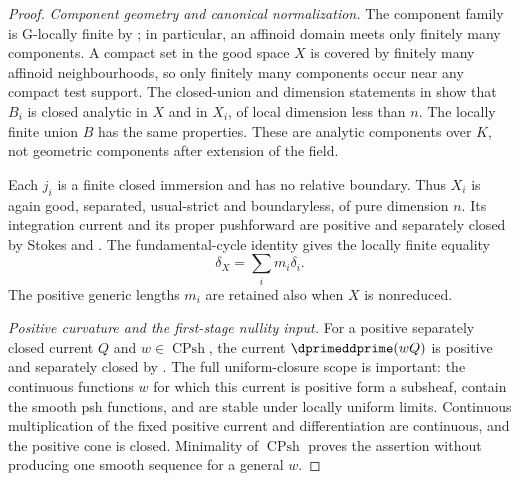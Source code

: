 \begin{proof}
\emph{Component geometry and canonical normalization.}
The component family is G-locally finite by
\cite[Theorem~4.20]{Ducros09Excellence}; in particular, an affinoid domain
meets only finitely many components.  A compact set in the good space $X$
is covered by finitely many affinoid neighbourhoods, so only finitely many
components occur near any compact test support.  The closed-union and
dimension statements in
\cite[\S4, especially Theorem~4.20 and paragraphs~4.21--4.24]{Ducros09Excellence}
show that $B_i$ is closed analytic in $X$ and in $X_i$, of local dimension
less than $n$.  The locally finite union $B$ has the same properties.
These are analytic components over $K$, not geometric components after
extension of the field.

Each $j_i$ is a finite closed immersion and has no relative boundary.
Thus $X_i$ is again good, separated, usual-strict and boundaryless, of pure
dimension $n$.  Its integration current and its proper pushforward are
positive and separately closed by Stokes and
.
The fundamental-cycle identity
 gives the locally finite equality
\begin{equation}
                         \delta_X=\sum_i m_i\delta_i.
 \label{eq:ch14-component-canonical-sum}
\end{equation}
The positive generic lengths $m_i$ are retained also when $X$ is
nonreduced.

\emph{Positive curvature and the first-stage nullity input.}
For a positive separately closed current $Q$ and
$w\in\operatorname{CPsh}$, the current
$\dprimeddprime(wQ)$ is positive and separately closed by
\cite[Lemma~8.5.5]{CLD25}.  The full uniform-closure scope is important:
the continuous functions $w$ for which this current is positive form a
subsheaf, contain the smooth psh functions, and are stable under locally
uniform limits.  Continuous multiplication of the fixed positive current
and differentiation are continuous, and the positive cone is closed.
Minimality of $\operatorname{CPsh}$ proves the assertion without producing
one smooth sequence for a general $w$.


\end{proof}
